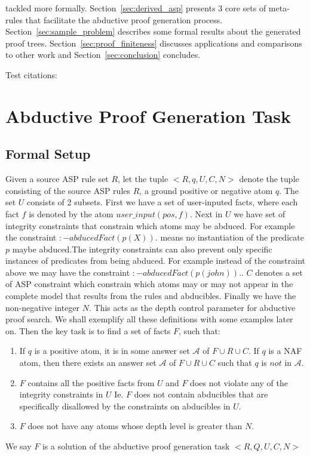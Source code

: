\documentclass{article}
\begin{document}
tackled more formally. Section~\ref{sec:derived_asp} presents 3 core sets of meta-rules that facilitate the abductive proof generation process. Section~\ref{sec:sample_problem} describes some formal results about the generated proof trees. Section~\ref{sec:proof_finiteness} discusses applications and comparisons to other work and Section~\ref{sec:conclusion} concludes. 

Test citations: \cite{lim22:_autom_defeas_reason_law,mahajan22:_overv_cclaw_l4}


\section{Abductive Proof Generation Task}\label{sec:abductive_proof}
\subsection{Formal Setup}
Given a source ASP rule set $R$, let the tuple $<R,q,U,C,N>$ denote the tuple consisting of the source ASP rules $R$, a ground positive or negative atom $q$. The set $U$ consists of 2 subsets. First we have a set of user-inputed facts, where each fact $f$ is denoted by the atom $user\_input(pos,f)$. Next in $U$ we have set of integrity constraints that constrain which atoms may be abduced. For example the constraint $:-abducedFact(p(X)).$ means no instantiation of the predicate $p$ maybe abduced.The integrity constraints can also prevent only specific instances of predicates from being abduced. For example instead of the constraint above we may have the constraint $:-abducedFact(p(john)).$.  $C$ denotes a set of ASP constraint which constrain which atoms may or may not appear in the complete model that results from the rules and abducibles. Finally we have the non-negative integer $N$. This acts as the depth control parameter for abductive proof search. We shall exemplify all these definitions with some examples later on. Then the key task is to find a set of facts $F$, such that:

\begin{enumerate}
    \item If $q$ is a positive atom, it is in some answer set $\mathcal{A}$ of $F\cup R\cup C$. If $q$ is a NAF atom, then there exists an answer set $\mathcal{A}$ of $F\cup R\cup C$ such that $q$ is $not$ in $\mathcal{A}$.
    \item $F$ contains all the positive facts from $U$ and $F$ does not violate any of the integrity constraints in $U$ Ie. $F$ does not contain abducibles that are specifically disallowed by the constraints on abducibles in $U$.
    \item $F$ does not have any atoms whose depth level is greater than $N$.
\end{enumerate}
We say $F$ is a solution of the abductive proof generation task $<R,Q,U,C,N>$
\end{document}
